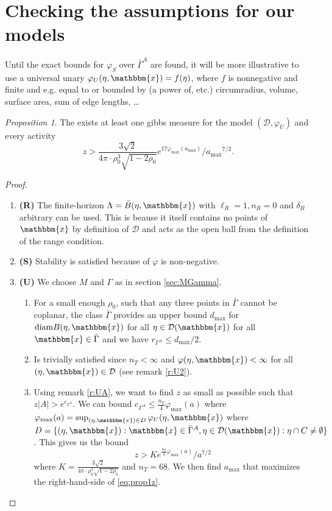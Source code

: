 \documentclass[12pt,a4paper]{article}
\theoremstyle{definition}
\theoremstyle{remark}
\theoremstyle{theorem}
\newtheorem{proposition}{Proposition}
\newcommand{\x}{\mathbbm{x}}
\begin{document}
\section{Checking the assumptions for our models}

 Until the exact bounds for $\varphi_S$ over $\bar\Gamma^A$ are found, it will be more illustrative to use a universal unary $\varphi_U(\eta,\x)=f(\eta)$, where $f$ is nonnegative and finite and e.g. equal to or bounded by (a power of, etc.) circumradius, volume, surface area, sum of edge lengths, \dots


\begin{proposition}
	The exists at least one gibbs measure for the model $(\mathcal D,\varphi_U)$ and every activity
	$$z > \frac{3\sqrt{2}}{4\pi \cdot \rho_0^3 \sqrt{1-2\rho_0}} e^{17 \varphi_{\text{max}}(a_{\text{max}})} / {a_{\text{max}}}^{7/2}.$$
\end{proposition}
\begin{proof}
\begin{enumerate}[]
	\item \textbf{(R)} The finite-horizon $\Lambda = \bar B(\eta,\x)$ with $\ell_R = 1, n_R = 0$ and $\delta_R$ arbitrary can be used. This is beause it itself contains no points of $\x$ by definition of $\mathcal D$ and acts as the open ball from the definition of the range condition.
	\item \textbf{(S)} Stability is satisfied because of $\varphi$ is non-negative.
	\item \textbf{(U)} We choose $M$ and $\Gamma$ as in section \ref{sec:MGamma}.
		\begin{enumerate}[(U1)]
			\item For a small enough $\rho_0$, such that any three points in $\bar \Gamma$ cannot be coplanar, the class $\bar\Gamma$ provides an upper bound $d_{\text{max}}$ for $\text{diam} B(\eta,\x)$ for all $\eta \in \mathcal D(\x)$ for all $\x \in \bar \Gamma$ and we have $r_{\Gamma^A} \leq d_{\text{max}} / 2$.  
			\item Is trivially satisfied since $n_T < \infty$ and $\varphi(\eta,\x)<\infty$ for all $(\eta,\x)\in\mathcal D$ (see remark \ref{r:U2}).
			\item Using remark \ref{r:UA}, we want to find $z$ as small as possible such that $z|A| > e^{c_{\Gamma^A}}$. We can bound $c_{\Gamma^A} \leq \frac {n_T}4 \varphi_{\text{max}}(a) $ where $\varphi_{\text{max}}(a) = \sup_{(\eta,\x) \in D} \varphi_U(\eta,\x)$ where $D=\{ (\eta,\x): \x \in \bar\Gamma^A, \eta \in \mathcal D(\x): \eta\cap C \neq \emptyset\}$.  This gives us the bound
				\begin{equation}z > K e^{\frac{n_T}{4} \varphi_{\text{max}}(a)}/a^{7/2}\label{eq:prop1z}\end{equation}
				where $K = \frac{3\sqrt{2}}{4\pi \cdot \rho_0^3 \sqrt{1-2\rho_0}}$ and $n_T = 68$. We then find $a_\text{max}$ that maximizes the right-hand-side of \ref{eq:prop1z}.
		\end{enumerate}
\end{enumerate}
\end{proof}
\end{document}
